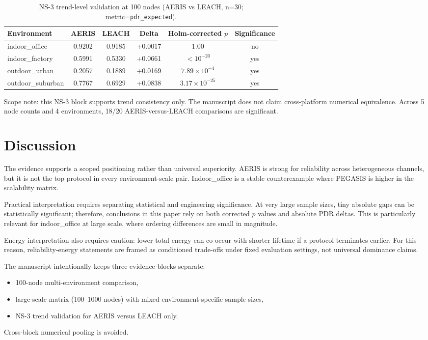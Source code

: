 \documentclass[sensors,article,submit,moreauthors,pdftex]{Definitions/mdpi}
\begin{document}
\begin{table}[H]
\caption{NS-3 trend-level validation at 100 nodes (AERIS vs LEACH, n=30; metric=\texttt{pdr\_expected}).}
\label{tab:ns3_trend}
\centering
\begin{tabular}{lccccc}
\toprule
Environment & AERIS & LEACH & Delta & Holm-corrected $p$ & Significance \\
\midrule
indoor\_office    & 0.9202 & 0.9185 & +0.0017 & 1.00 & no \\
indoor\_factory   & 0.5991 & 0.5330 & +0.0661 & $<10^{-20}$ & yes \\
outdoor\_urban    & 0.2057 & 0.1889 & +0.0169 & $7.89\times10^{-4}$ & yes \\
outdoor\_suburban & 0.7767 & 0.6929 & +0.0838 & $3.17\times10^{-25}$ & yes \\
\bottomrule
\end{tabular}
\end{table}

Scope note: this NS-3 block supports trend consistency only. The manuscript does not claim cross-platform numerical equivalence. Across 5 node counts and 4 environments, 18/20 AERIS-versus-LEACH comparisons are significant.

\section{Discussion}
The evidence supports a scoped positioning rather than universal superiority. AERIS is strong for reliability across heterogeneous channels, but it is not the top protocol in every environment-scale pair. Indoor\_office is a stable counterexample where PEGASIS is higher in the scalability matrix.

Practical interpretation requires separating statistical and engineering significance. At very large sample sizes, tiny absolute gaps can be statistically significant; therefore, conclusions in this paper rely on both corrected $p$ values and absolute PDR deltas. This is particularly relevant for indoor\_office at large scale, where ordering differences are small in magnitude.

Energy interpretation also requires caution: lower total energy can co-occur with shorter lifetime if a protocol terminates earlier. For this reason, reliability-energy statements are framed as conditioned trade-offs under fixed evaluation settings, not universal dominance claims.

The manuscript intentionally keeps three evidence blocks separate:
\begin{itemize}
\item 100-node multi-environment comparison,
\item large-scale matrix (100--1000 nodes) with mixed environment-specific sample sizes,
\item NS-3 trend validation for AERIS versus LEACH only.
\end{itemize}
Cross-block numerical pooling is avoided.
\end{document}
